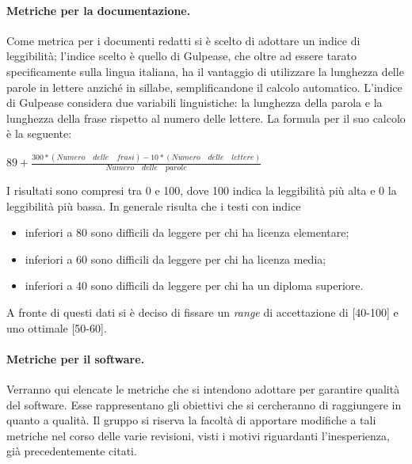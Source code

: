 \paragraph{Metriche per la documentazione.}
\label{metriche_documentazione} Come metrica per i documenti redatti si è scelto di adottare un indice di leggibilità; l'indice scelto è quello di Gulpease, che oltre ad essere tarato specificamente sulla lingua italiana, ha il vantaggio di utilizzare la lunghezza delle parole in lettere anziché in sillabe, semplificandone il calcolo automatico.
L'indice di Gulpease considera due variabili linguistiche: la lunghezza della parola e la lunghezza della frase rispetto al numero delle lettere. La formula per il suo calcolo è la seguente:

\begin{center}
	\begin{math}
		89+\frac{300*(Numero\quad delle\quad frasi)-10*(Numero\quad delle\quad lettere)}{Numero\quad delle\quad parole}
	\end{math}
\end{center}

I risultati sono compresi tra 0 e 100, dove 100 indica la leggibilità più alta e 0 la leggibilità più bassa. In generale risulta che i testi con indice
\begin{itemize}
	\item inferiori a 80 sono difficili da leggere per chi ha licenza elementare;
	\item inferiori a 60 sono difficili da leggere per chi ha licenza media;
	\item inferiori a 40 sono difficili da leggere per chi ha un diploma superiore.
\end{itemize}
A fronte di questi dati si è deciso di fissare un \textit{range} di accettazione di [40-100] e uno ottimale [50-60].

\paragraph{Metriche per il software.}
\label{metriche_per_il_software}
Verranno qui elencate le metriche che si intendono adottare per garantire qualità del software. Esse rappresentano gli obiettivi che si cercheranno di raggiungere in quanto a qualità. Il gruppo si riserva la facoltà di apportare modifiche a tali metriche nel corso delle varie revisioni, visti i motivi riguardanti l'inesperienza, già precedentemente citati.

